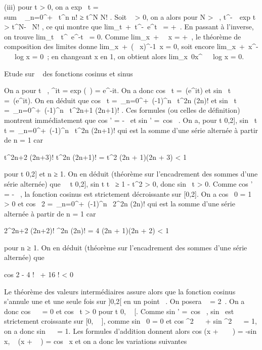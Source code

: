 \documentclass[]{article}
\begin{document}
(iii) pour t \textgreater{} 0, on a exp~ t
= \\sum ~
_n=0^+\infty~ t^n \over n! ≥
t^N \over N! . Soit \alpha~ \textgreater{} 0, on a
alors pour N \textgreater{} \alpha~, t^-\alpha~\
exp t \textgreater{} t^N-\alpha~ \over N! , ce
qui montre que
lim_t\rightarrow~+\infty~t^-\alpha~e^t~
= +\infty~. En passant à l'inverse, on trouve
lim_t\rightarrow~\infty~t^\alpha~e^-t~
= 0. Comme
lim_x\rightarrow~+\infty~\log~
x = +\infty~, le théorème de composition des limites donne
lim_x\rightarrow~+\infty~(\log~
x)^-1\diagup\alpha~x = 0, soit encore
lim_x\rightarrow~+\infty~x^-\alpha~~\
log x = 0~; en changeant x en 1\diagupx, on obtient alors
lim_x\rightarrow~0x^\alpha~~\
log x = 0.

Etude sur ~ des fonctions cosinus et sinus

On a pour t \in {}~, \overlinee^it
= exp (\overlineit~) =
e^-it. On a donc cos~ t
=\
\mathrmRe(e^it) et
sin~ t =\
\mathrmIm(e^it). On en déduit que
cos~ t =\
\sum  _n=0^+\infty~(-1)^n~
t^2n \over (2n)! et
sin~ t =\
\sum  _n=0^+\infty~(-1)^n~
t^2n+1 \over (2n+1)! . Ces formules (ou
celles de définition) montrent immédiatement que
cos ' = -\sin~ et
sin ' =\ cos~ . On a,
pour t \in{]}0,2{]},  sin~ t
\over t =\
\sum  _n=0^+\infty~(-1)^n~
t^2n \over (2n+1)! qui est la somme d'une
série alternée à partir de n = 1 car

  t^2n+2 \over (2n+3)!
\over  t^2n \over (2n+1)!
 = t^2 \over (2n + 1)(2n + 3)
\textless{} 1

pour t \in{]}0,2{]} et n ≥ 1. On en déduit (théorème sur l'encadrement des
sommes d'une série alternée) que \forall~~t
\in{]}0,2{]}, sin t \over t~ ≥
1 - t^2 \over 6 \textgreater{} 0, donc
sin~ t \textgreater{} 0. Comme
cos ' = -\sin~ , la
fonction cosinus est strictement décroissante sur {[}0,2{]}. On a
cos~ 0 = 1 \textgreater{} 0 et
cos~ 2 =\
\sum  _n=0^+\infty~(-1)^n~
2^2n \over (2n)! qui est la somme d'une
série alternée à partir de n = 1 car

  2^2n+2 \over (2n+2)!
^2n \over (2n)! 
= 4 \over (2n + 1)(2n + 2) \textless{} 1

pour n ≥ 1. On en déduit (théorème sur l'encadrement des sommes d'une
série alternée) que

cos 2 \leq 1 - 4 !~ +
16 ! \textless{} 0

Le théorème des valeurs intermédiaires assure alors que la fonction
cosinus s'annule une et une seule fois sur {]}0,2{[} en un point \alpha~. On
posera \pi~ = 2\alpha~. On a donc cos~  \pi~
 = 0 et cos~ t
\textgreater{} 0 pour t \in {[}0, \pi~  {[}. Comme
sin ' =\ cos~ ,
sin~ est strictement croissante sur {[}0, \pi~
\over 2 {]}, comme sin~ 0 = 0
et cos ^2~ \pi~ \over
2 + sin ^2~ \pi~
\over 2 = 1, on a donc sin~ 
\pi~ \over 2 = 1. Les formules d'addition donnent alors
cos (x + \pi~ \over 2~ ) =
-sin x, \sin~ (x + \pi~
\over 2 ) = cos~ x et on a
donc les variations suivantes
\end{document}
